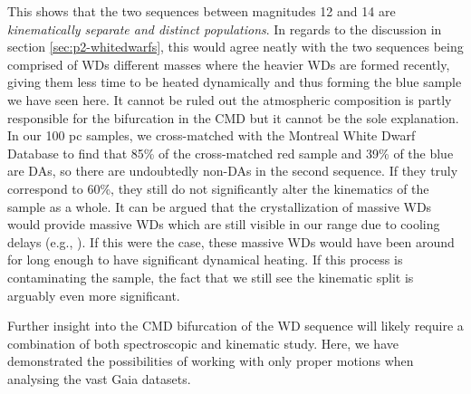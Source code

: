 This shows that the two sequences between magnitudes 12 and 14 are \textit{kinematically separate and distinct populations}. In regards to the discussion in section \ref{sec:p2-whitedwarfs}, this would agree neatly with the two sequences being comprised of WDs different masses where the heavier WDs are formed recently, giving them less time to be heated dynamically and thus forming the blue sample we have seen here. It cannot be ruled out the atmospheric composition is partly responsible for the bifurcation in the CMD but it cannot be the sole explanation. In our 100 pc samples, we cross-matched with the Montreal White Dwarf Database \citep{dufour:17} to find that 85\% of the cross-matched red sample and 39\% of the blue are DAs, so there are undoubtedly non-DAs in the second sequence. If they truly correspond to 60\%, they still do not significantly alter the kinematics of the sample as a whole. It can be argued that the crystallization of massive WDs would provide massive WDs which are still visible in our range due to cooling delays (e.g., \citealt{tremblay:19, bergeron:19, bauer:20}). If this were the case, these massive WDs would have been around for long enough to have significant dynamical heating. If this process is contaminating the sample, the fact that we still see the kinematic split is arguably even more significant.

Further insight into the CMD bifurcation of the WD sequence will likely require a combination of both spectroscopic and kinematic study. Here, we have demonstrated the possibilities of working with only proper motions when analysing the vast Gaia datasets. 